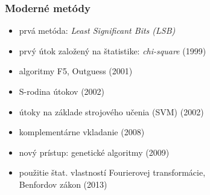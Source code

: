 \documentclass{beamer}
\begin{document}

\begin{frame}
    \frametitle{Moderné metódy}
    \begin{itemize}
        \item prvá metóda: \emph{Least Significant Bits (LSB)}
        \item prvý útok založený na štatistike: \emph{chi-square} (1999)
        \item algoritmy F5, Outguess (2001)
        \item S-rodina útokov (2002)
        \item útoky na základe strojového učenia (SVM) (2002)
        \item komplementárne vkladanie (2008)
        \item nový prístup: genetické algoritmy (2009)
        \item použitie štat. vlastností Fourierovej transformácie,\\
            Benfordov zákon (2013)
    \end{itemize}
\end{frame}
\end{document}
